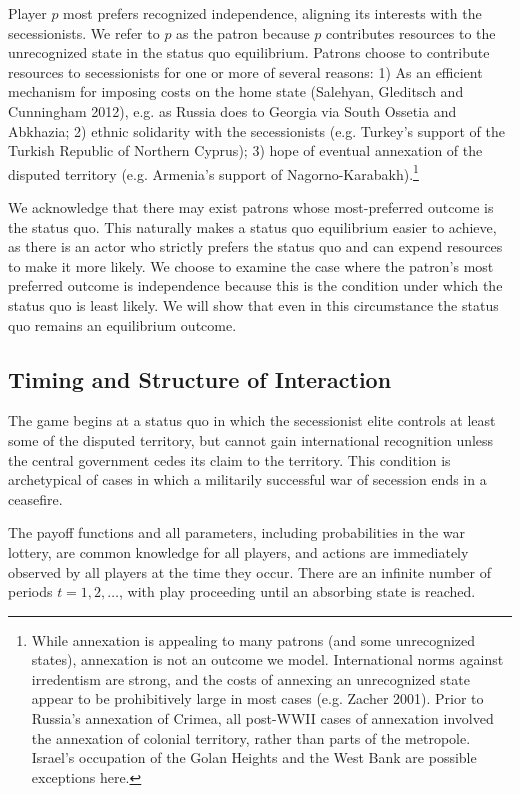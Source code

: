 \documentclass[11pt,letterpaper, notitlepage]{article}
\begin{document}
Player $p$ most prefers recognized independence, aligning its interests with the secessionists. We refer to $p$ as the patron because $p$ contributes resources to the unrecognized state in the status quo equilibrium. Patrons choose to contribute resources to secessionists for one or more of several reasons: 1) As an efficient mechanism for imposing costs on the home state (Salehyan, Gleditsch and Cunningham 2012), e.g. as Russia does to Georgia via South Ossetia and Abkhazia; 2) ethnic solidarity with the secessionists (e.g. Turkey's support of the Turkish Republic of Northern Cyprus); 3) hope of eventual annexation of the disputed territory (e.g. Armenia's support of Nagorno-Karabakh).\footnote{While annexation is appealing to many patrons (and some unrecognized states), annexation is not an outcome we model. International norms against irredentism are strong, and the costs of annexing an unrecognized state appear to be prohibitively large in most cases (e.g. Zacher 2001). Prior to Russia's annexation of Crimea, all post-WWII cases of annexation involved the annexation of colonial territory, rather than parts of the metropole. Israel's occupation of the Golan Heights and the West Bank are possible exceptions here.}

We acknowledge that there may exist patrons whose most-preferred outcome is the status quo. This naturally makes a status quo equilibrium easier to achieve, as there is an actor who strictly prefers the status quo and can expend resources to make it more likely. We choose to examine the case where the patron's most preferred outcome is independence because this is the condition under which the status quo is least likely. We will show that even in this circumstance the status quo remains an equilibrium outcome.    

\subsection{Timing and Structure of Interaction}
\label{sec:structure}

The game begins at a status quo in which the secessionist elite controls at least some of the disputed territory, but cannot gain international recognition unless the central government cedes its claim to the territory. This condition is archetypical of cases in which a militarily successful war of secession ends in a ceasefire.  

The payoff functions and all parameters, including probabilities in the war lottery, are common knowledge for all players, and actions are immediately observed by all players at the time they occur. There are an infinite number of periods $t=1,2,\ldots$, with play proceeding until an absorbing state is reached.
\end{document}
